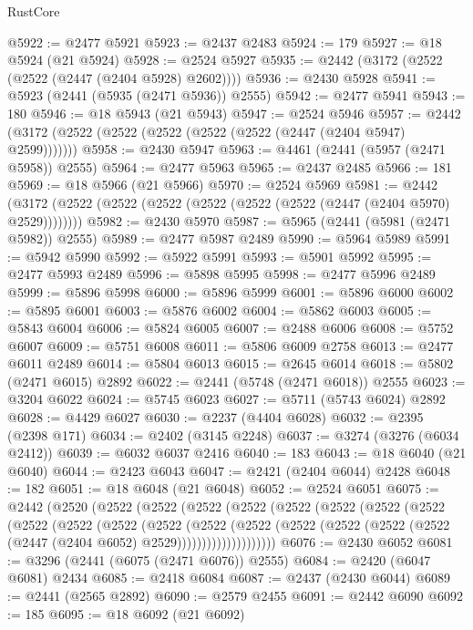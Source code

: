 \begin{lexlean}{RustCore}
\begin{coremodule}
@5922 := @2477 @5921
@5923 := @2437 @2483
@5924 := 179
@5927 := @18 @5924 (@21 @5924)
@5928 := @2524 @5927
@5935 := @2442 (@3172 (@2522 (@2522 (@2447 (@2404 @5928) @2602))))
@5936 := @2430 @5928
@5941 := @5923 (@2441 (@5935 (@2471 @5936)) @2555)
@5942 := @2477 @5941
@5943 := 180
@5946 := @18 @5943 (@21 @5943)
@5947 := @2524 @5946
@5957 := @2442 (@3172 (@2522 (@2522 (@2522 (@2522 (@2522 (@2447 (@2404 @5947) @2599)))))))
@5958 := @2430 @5947
@5963 := @4461 (@2441 (@5957 (@2471 @5958)) @2555)
@5964 := @2477 @5963
@5965 := @2437 @2485
@5966 := 181
@5969 := @18 @5966 (@21 @5966)
@5970 := @2524 @5969
@5981 := @2442 (@3172 (@2522 (@2522 (@2522 (@2522 (@2522 (@2522 (@2447 (@2404 @5970) @2529))))))))
@5982 := @2430 @5970
@5987 := @5965 (@2441 (@5981 (@2471 @5982)) @2555)
@5989 := @2477 @5987 @2489
@5990 := @5964 @5989
@5991 := @5942 @5990
@5992 := @5922 @5991
@5993 := @5901 @5992
@5995 := @2477 @5993 @2489
@5996 := @5898 @5995
@5998 := @2477 @5996 @2489
@5999 := @5896 @5998
@6000 := @5896 @5999
@6001 := @5896 @6000
@6002 := @5895 @6001
@6003 := @5876 @6002
@6004 := @5862 @6003
@6005 := @5843 @6004
@6006 := @5824 @6005
@6007 := @2488 @6006
@6008 := @5752 @6007
@6009 := @5751 @6008
@6011 := @5806 @6009 @2758
@6013 := @2477 @6011 @2489
@6014 := @5804 @6013
@6015 := @2645 @6014
@6018 := @5802 (@2471 @6015) @2892
@6022 := @2441 (@5748 (@2471 @6018)) @2555
@6023 := @3204 @6022
@6024 := @5745 @6023
@6027 := @5711 (@5743 @6024) @2892
@6028 := @4429 @6027
@6030 := @2237 (@4404 @6028)
@6032 := @2395 (@2398 @171)
@6034 := @2402 (@3145 @2248)
@6037 := @3274 (@3276 (@6034 @2412))
@6039 := @6032 @6037 @2416
@6040 := 183
@6043 := @18 @6040 (@21 @6040)
@6044 := @2423 @6043
@6047 := @2421 (@2404 @6044) @2428
@6048 := 182
@6051 := @18 @6048 (@21 @6048)
@6052 := @2524 @6051
@6075 := @2442
    (@2520
      (@2522
        (@2522
          (@2522
            (@2522
              (@2522
                (@2522
                  (@2522
                    (@2522
                      (@2522
                        (@2522
                          (@2522
                            (@2522
                              (@2522
                                (@2522
                                  (@2522
                                    (@2522
                                      (@2522 (@2522 (@2447 (@2404 @6052) @2529))))))))))))))))))))
@6076 := @2430 @6052
@6081 := @3296 (@2441 (@6075 (@2471 @6076)) @2555)
@6084 := @2420 (@6047 @6081) @2434
@6085 := @2418 @6084
@6087 := @2437 (@2430 @6044)
@6089 := @2441 (@2565 @2892)
@6090 := @2579 @2455
@6091 := @2442 @6090
@6092 := 185
@6095 := @18 @6092 (@21 @6092)

\end{coremodule}
\end{lexlean}
